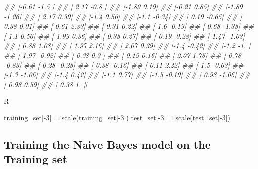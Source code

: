 \documentclass[
]{book}
\newenvironment{Shaded}{\begin{snugshade}}{\end{snugshade}}
\newcommand{\CommentTok}[1]{\textcolor[rgb]{0.56,0.35,0.01}{\textit{#1}}}
\newcommand{\DecValTok}[1]{\textcolor[rgb]{0.00,0.00,0.81}{#1}}
\newcommand{\FunctionTok}[1]{\textcolor[rgb]{0.00,0.00,0.00}{#1}}
\newcommand{\NormalTok}[1]{#1}
\newcommand{\OtherTok}[1]{\textcolor[rgb]{0.56,0.35,0.01}{#1}}
\newcommand{\SpecialCharTok}[1]{\textcolor[rgb]{0.00,0.00,0.00}{#1}}
\theoremstyle{definition}
\theoremstyle{definition}
\theoremstyle{definition}
\theoremstyle{definition}
\theoremstyle{remark}
\begin{document}
\begin{Shaded}
\begin{Highlighting}[]
\CommentTok{\#\#  [{-}0.61 {-}1.5 ]}
\CommentTok{\#\#  [ 2.17 {-}0.8 ]}
\CommentTok{\#\#  [{-}1.89  0.19]}
\CommentTok{\#\#  [{-}0.21  0.85]}
\CommentTok{\#\#  [{-}1.89 {-}1.26]}
\CommentTok{\#\#  [ 2.17  0.39]}
\CommentTok{\#\#  [{-}1.4   0.56]}
\CommentTok{\#\#  [{-}1.1  {-}0.34]}
\CommentTok{\#\#  [ 0.19 {-}0.65]}
\CommentTok{\#\#  [ 0.38  0.01]}
\CommentTok{\#\#  [{-}0.61  2.33]}
\CommentTok{\#\#  [{-}0.31  0.22]}
\CommentTok{\#\#  [{-}1.6  {-}0.19]}
\CommentTok{\#\#  [ 0.68 {-}1.38]}
\CommentTok{\#\#  [{-}1.1   0.56]}
\CommentTok{\#\#  [{-}1.99  0.36]}
\CommentTok{\#\#  [ 0.38  0.27]}
\CommentTok{\#\#  [ 0.19 {-}0.28]}
\CommentTok{\#\#  [ 1.47 {-}1.03]}
\CommentTok{\#\#  [ 0.88  1.08]}
\CommentTok{\#\#  [ 1.97  2.16]}
\CommentTok{\#\#  [ 2.07  0.39]}
\CommentTok{\#\#  [{-}1.4  {-}0.42]}
\CommentTok{\#\#  [{-}1.2  {-}1.  ]}
\CommentTok{\#\#  [ 1.97 {-}0.92]}
\CommentTok{\#\#  [ 0.38  0.3 ]}
\CommentTok{\#\#  [ 0.19  0.16]}
\CommentTok{\#\#  [ 2.07  1.75]}
\CommentTok{\#\#  [ 0.78 {-}0.83]}
\CommentTok{\#\#  [ 0.28 {-}0.28]}
\CommentTok{\#\#  [ 0.38 {-}0.16]}
\CommentTok{\#\#  [{-}0.11  2.22]}
\CommentTok{\#\#  [{-}1.5  {-}0.63]}
\CommentTok{\#\#  [{-}1.3  {-}1.06]}
\CommentTok{\#\#  [{-}1.4   0.42]}
\CommentTok{\#\#  [{-}1.1   0.77]}
\CommentTok{\#\#  [{-}1.5  {-}0.19]}
\CommentTok{\#\#  [ 0.98 {-}1.06]}
\CommentTok{\#\#  [ 0.98  0.59]}
\CommentTok{\#\#  [ 0.38  1.  ]]}
\end{Highlighting}
\end{Shaded}

R

\begin{Shaded}
\begin{Highlighting}[]
\NormalTok{training\_set[}\SpecialCharTok{{-}}\DecValTok{3}\NormalTok{] }\OtherTok{=} \FunctionTok{scale}\NormalTok{(training\_set[}\SpecialCharTok{{-}}\DecValTok{3}\NormalTok{])}
\NormalTok{test\_set[}\SpecialCharTok{{-}}\DecValTok{3}\NormalTok{] }\OtherTok{=} \FunctionTok{scale}\NormalTok{(test\_set[}\SpecialCharTok{{-}}\DecValTok{3}\NormalTok{])}
\end{Highlighting}
\end{Shaded}

\hypertarget{training-the-naive-bayes-model-on-the-training-set}{%
\subsection{Training the Naive Bayes model on the Training set}\label{training-the-naive-bayes-model-on-the-training-set}}
\end{document}
